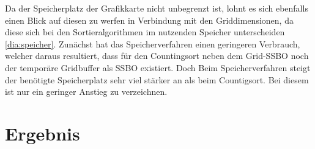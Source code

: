 \documentclass[intern,palatino]{cgBA}
\begin{document}
Da der Speicherplatz der Grafikkarte nicht unbegrenzt ist, lohnt es sich ebenfalls einen Blick auf diesen zu werfen in Verbindung mit den Griddimensionen, da diese sich bei den Sortieralgorithmen im nutzenden Speicher unterscheiden \ref{dia:speicher}.
\newline
Zunächst hat das Speicherverfahren einen geringeren Verbrauch, welcher daraus resultiert, dass für den Countingsort neben dem Grid-SSBO noch der temporäre Gridbuffer als SSBO existiert. Doch Beim Speicherverfahren steigt der benötigte Speicherplatz sehr viel stärker an als beim Countigsort. Bei diesem ist nur ein geringer Anstieg zu verzeichnen.

\newpage

\section{Ergebnis}\label{ergebnis}
\end{document}
